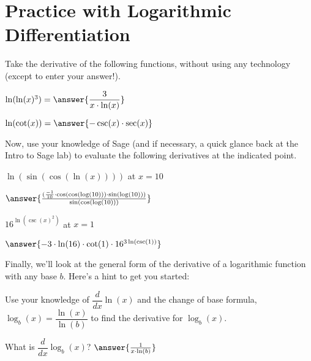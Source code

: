 \documentclass{ximera}
\begin{document}
\section{Practice with Logarithmic Differentiation}
Take the derivative of the following functions, without using any technology (except to enter your answer!).
\begin{problem}
$\ln(\ln(x)^3)=\answer{\dfrac{3}{x\cdot \ln(x)}}$
\end{problem}

\begin{problem}
$\ln(\cot(x))=\answer{-\csc(x)\cdot\sec(x)}$
\end{problem}

Now, use your knowledge of Sage (and if necessary, a quick glance back at the Intro to Sage lab) to evaluate the following derivatives at the indicated point.

\begin{onlineOnly}
\begin{sageCell}

\end{sageCell}
\end{onlineOnly}

\begin{problem}
$\ln(\sin(\cos(\ln(x))))$ at $x=10$

$\answer{\frac{(\frac{-1}{10}\cdot\cos(\cos(\log(10)))\cdot\sin(\log(10)))}{\sin(\cos(\log(10)))}}$
\end{problem}

\begin{problem}
$16^{\ln(\csc(x)^2)}$ at $x = 1$

$\answer{-3\cdot\ln(16)\cdot\cot(1)\cdot 16^{3\ln(\csc(1))}}$
\end{problem}

Finally, we'll look at the general form of the derivative of a logarithmic function with any base $b$. Here's a hint to get you started:

Use your knowledge of $\dfrac{d}{dx} \ln(x)$ and the change of base formula, $\log_b(x) = \dfrac{\ln(x)}{\ln(b)}$ to find the derivative for $\log_b(x)$.
\begin{problem}
What is $\dfrac{d}{dx}\log_b(x)$?
$\answer{\frac{1}{x\cdot\ln(b)}}$
\end{problem}
\end{document}
